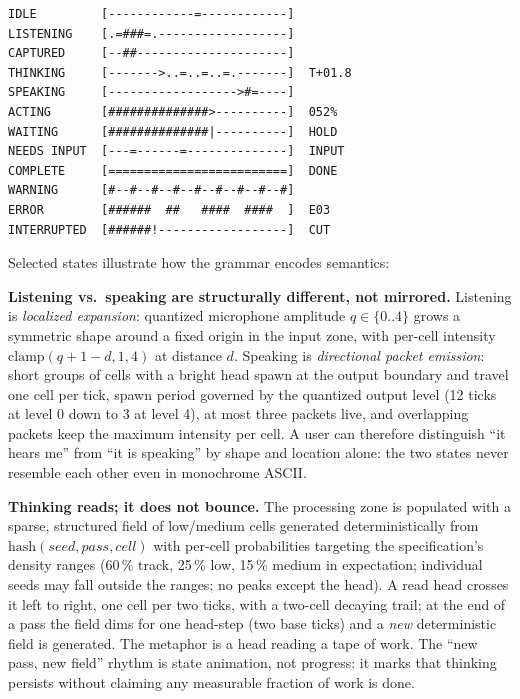 \documentclass[11pt]{article}
\begin{document}
\begin{lstlisting}
IDLE         [------------=------------]
LISTENING    [.=###=.------------------]
CAPTURED     [--##---------------------]
THINKING     [------->..=..=..=.-------]  T+01.8
SPEAKING     [------------------>#=----]
ACTING       [##############>----------]  052%
WAITING      [##############|----------]  HOLD
NEEDS INPUT  [---=------=--------------]  INPUT
COMPLETE     [=========================]  DONE
WARNING      [#--#--#--#--#--#--#--#--#]
ERROR        [######  ##   ####  ####  ]  E03
INTERRUPTED  [######!------------------]  CUT
\end{lstlisting}

Selected states illustrate how the grammar encodes semantics:

\textbf{Listening vs.\ speaking are structurally different, not mirrored.}
Listening is \emph{localized expansion}: quantized microphone amplitude
$q \in \{0..4\}$ grows a symmetric shape around a fixed origin in the
input zone, with per-cell intensity $\mathrm{clamp}(q{+}1{-}d, 1, 4)$ at
distance $d$. Speaking is \emph{directional packet emission}: short
groups of cells with a bright head spawn at the output boundary and travel
one cell per tick, spawn period governed by the quantized output level (12
ticks at level 0 down to 3 at level 4), at most three packets live, and
overlapping packets keep the maximum intensity per cell. A user can
therefore distinguish ``it hears me'' from ``it is speaking'' by shape
and location alone: the two states never resemble each other even in
monochrome ASCII.

\textbf{Thinking reads; it does not bounce.} The processing zone is
populated with a sparse, structured field of low/medium cells generated
deterministically from $\mathrm{hash}(\mathit{seed}, \mathit{pass},
\mathit{cell})$ with per-cell probabilities targeting the specification's density
ranges (60\,\% track, 25\,\% low, 15\,\% medium in expectation;
individual seeds may fall outside the ranges; no peaks except the head). A read head crosses it left
to right, one cell per two ticks, with a two-cell decaying trail; at the
end of a pass the field dims for one head-step (two base ticks) and a
\emph{new} deterministic field is generated. The metaphor is a head
reading a tape of work. The ``new pass, new field'' rhythm is state
animation, not progress: it marks that thinking persists without claiming
any measurable fraction of work is done.
\end{document}
